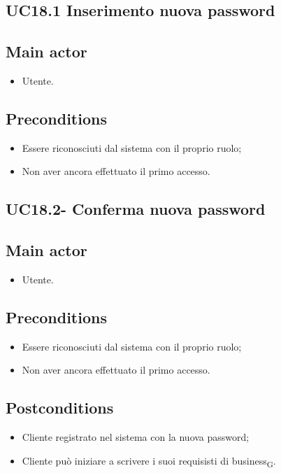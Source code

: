 \documentclass{article}
\begin{document}
        \subsection{UC18.1 Inserimento nuova password}
            \subsection*{Main actor}
        \begin{itemize}
            \item Utente.
        \end{itemize}
        
    \subsection*{Preconditions}
        \begin{itemize}
            \item Essere riconosciuti dal sistema con il proprio ruolo;
            \item Non aver ancora effettuato il primo accesso.
        \end{itemize}

    \subsection{UC18.2- Conferma nuova password}
    \subsection*{Main actor}
        \begin{itemize}
            \item Utente.
        \end{itemize}
        
    \subsection*{Preconditions}
        \begin{itemize}
            \item Essere riconosciuti dal sistema con il proprio ruolo;
            \item Non aver ancora effettuato il primo accesso.
        \end{itemize}
        
    \subsection*{Postconditions}
        \begin{itemize}
            \item Cliente registrato nel sistema con la nuova password;
            \item Cliente può iniziare a scrivere i suoi requisisti di business\textsubscript{G}.
        \end{itemize}
\end{document}

